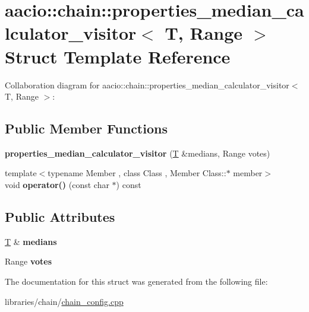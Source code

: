 \hypertarget{structaacio_1_1chain_1_1properties__median__calculator__visitor}{}\section{aacio\+:\+:chain\+:\+:properties\+\_\+median\+\_\+calculator\+\_\+visitor$<$ T, Range $>$ Struct Template Reference}
\label{structaacio_1_1chain_1_1properties__median__calculator__visitor}


Collaboration diagram for aacio\+:\+:chain\+:\+:properties\+\_\+median\+\_\+calculator\+\_\+visitor$<$ T, Range $>$\+:
\subsection*{Public Member Functions}
\begin{DoxyCompactItemize}
\item 
\mbox{\label{structaacio_1_1chain_1_1properties__median__calculator__visitor_a9f783406445b16db777c6a2a67552410}} 
{\bfseries properties\+\_\+median\+\_\+calculator\+\_\+visitor} (\mbox{\hyperlink{struct_t}{T}} \&medians, Range votes)
\item 
\mbox{\label{structaacio_1_1chain_1_1properties__median__calculator__visitor_aaf43dddfe29989ea9aba5f8e8e3ed98e}} 
{\footnotesize template$<$typename Member , class Class , Member Class\+::$\ast$ member$>$ }\\void {\bfseries operator()} (const char $\ast$) const
\end{DoxyCompactItemize}
\subsection*{Public Attributes}
\begin{DoxyCompactItemize}
\item 
\mbox{\label{structaacio_1_1chain_1_1properties__median__calculator__visitor_a1f17af0db1a3585b6e885584ff359780}} 
\mbox{\hyperlink{struct_t}{T}} \& {\bfseries medians}
\item 
\mbox{\label{structaacio_1_1chain_1_1properties__median__calculator__visitor_a62a632a88b2d3b7da1399013abe4c213}} 
Range {\bfseries votes}
\end{DoxyCompactItemize}


The documentation for this struct was generated from the following file\+:\begin{DoxyCompactItemize}
\item 
libraries/chain/\mbox{\hyperlink{chain__config_8cpp}{chain\+\_\+config.\+cpp}}\end{DoxyCompactItemize}
